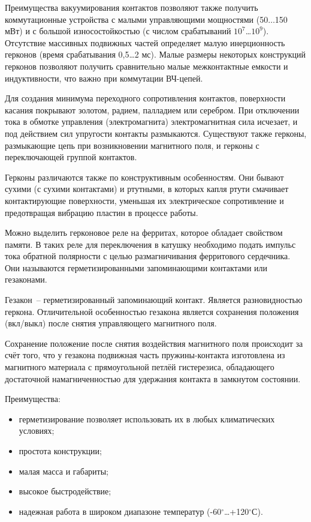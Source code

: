 Преимущества вакуумирования контактов позволяют также получить коммутационные устройства с малыми управляющими мощностями (50$ \ldots $150 мВт) и с большой износостойкостью (с числом срабатываний $ 10^7 $\ldots$ 10^9 $). Отсутствие массивных подвижных частей определяет малую инерционность герконов (время срабатывания 0,5\ldots2 мс). 
Малые размеры некоторых конструкций герконов позволяют получить сравнительно малые межконтактные емкости и индуктивности, что важно при коммутации ВЧ-цепей.

Для создания минимума переходного сопротивления контактов, поверхности касания покрывают золотом, радием, палладием или серебром. При отключении тока в обмотке управления (электромагнита) электромагнитная сила исчезает, и под действием сил упругости контакты размыкаются.
Существуют также герконы, размыкающие цепь при возникновении магнитного поля, и герконы с переключающей группой контактов.

Герконы различаются также по конструктивным особенностям. Они бывают сухими (с сухими контактами) и ртутными, в которых капля ртути смачивает контактирующие поверхности, уменьшая их электрическое сопротивление и предотвращая вибрацию пластин в процессе работы.

Можно выделить герконовое реле на ферритах, которое обладает свойством памяти. В таких реле для переключения в катушку необходимо подать импульс тока обратной полярности с целью размагничивания ферритового сердечника. Они называются герметизированными запоминающими контактами или гезаконами.

Гезакон~-- герметизированный запоминающий контакт. Является разновидностью геркона. Отличительной особенностью гезакона является сохранения положения (вкл/выкл) после снятия управляющего магнитного поля.

Сохранение положение после снятия воздействия магнитного поля происходит за счёт того, что у гезакона подвижная часть пружины-контакта изготовлена из магнитного материала с прямоугольной петлёй гистерезиса, обладающего достаточной намагниченностью для удержания контакта в замкнутом состоянии.

Преимущества: 
\begin{itemize}
\item герметизирование позволяет использовать их в любых климатических условиях; 
\item простота конструкции;
\item малая масса и габариты;
\item высокое быстродействие;
\item надежная работа в широком диапазоне температур (-60$^\circ$\ldots+120$^\circ$С).
\end{itemize}

